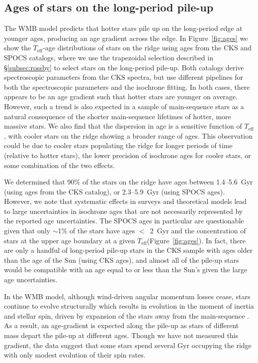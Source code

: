 \documentclass[linenumbers,tighten,trackchanges,twocolumn]{aastex631}
\newcommand{\teff}{\ensuremath{T_{\mathrm{eff}}}\xspace}
\begin{document}
\subsection{Ages of stars on the long-period pile-up}
\label{subsec:ages}
The WMB model predicts that hotter stars pile up on the long-period edge at younger ages, producing an age gradient across the edge. In Figure~\ref{fig:ages} we show the \teff-age distributions of stars on the ridge using ages from the CKS and SPOCS \citep{Brewer2018} catalogs, where we use the trapezoidal selection described in \S\ref{subsec:rossby} to select stars on the long-period pile-up. Both catalogs derive spectroscopic parameters from the CKS spectra, but use different pipelines for both the spectroscopic parameters and the isochrone fitting. In both cases, there appears to be an age gradient such that hotter stars are younger on average. However, such a trend is also expected in a sample of main-sequence stars as a natural consequence of the shorter main-sequence lifetimes of hotter, more massive stars. We also find that the dispersion in age is a sensitive function of \teff, with cooler stars on the ridge showing a broader range of ages. This observation could be due to cooler stars populating the ridge for longer periods of time (relative to hotter stars), the lower precision of isochrone ages for cooler stars, or some combination of the two effects.

We determined that 90\% of the stars on the ridge have ages between 1.4--5.6~Gyr (using ages from the CKS catalog), or 2.3--5.9~Gyr (using SPOCS ages). However, we note that systematic effects in surveys and theoretical models lead to large uncertainties in isochrone ages that are not necessarily represented by the reported age uncertainties. The SPOCS ages in particular are questionable given that only $\sim$1\% of the stars have ages $<$~2~Gyr and the concentration of stars at the upper age boundary at a given \teff (Figure~\ref{fig:ages}). In fact, there are only a handful of long-period pile-up stars in the CKS sample with ages older than the age of the Sun (using CKS ages), and almost all of the pile-up stars would be compatible with an age equal to or less than the Sun's given the large age uncertainties. 

In the WMB model, although wind-driven angular momentum losses cease, stars continue to evolve structurally which results in evolution in the moment of inertia and stellar spin, driven by expansion of the stars away from the main-sequence \citep{vanSaders2019}. As a result, an age-gradient is expected along the pile-up as stars of different mass depart the pile-up at different ages. Though we have not measured this gradient, the data suggest that some stars spend several Gyr occupying the ridge with only modest evolution of their spin rates.
\end{document}
